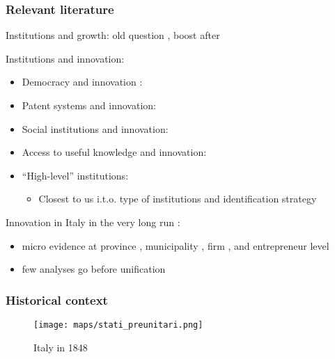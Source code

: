 \documentclass[10pt]{beamer}
\begin{document}
\begin{frame}
    \frametitle{Relevant literature}
    
    Institutions and growth: old question \citep{delong1993}, boost after \cite{acemoglu2001, acemoglu2002} \citep{rodrik2004, aghion2007} \\  \bigskip

    Institutions and innovation: %
    \begin{itemize}
        \item Democracy and innovation \citep[the "Popper" hypothesis][]{gao2017}: \cite{aghion2007, acemoglu2019, gao2017, wang2021}
        \item Patent systems and innovation: \cite{moser2005, lerner2009}
        \item Social institutions and innovation: \cite{greif2012}
        \item Access to useful knowledge and innovation: \citep{buonanno2024}
        \item ``High-level'' institutions: \cite{donges2022}
        \begin{itemize}
            \item Closest to us i.t.o. type of institutions and identification strategy 
        \end{itemize}
    \end{itemize}
    
    \bigskip

    \pause

    Innovation in Italy in the very long run \citep{barbielliniamidei2013, nuvolari2015b}:
    \begin{itemize}
        \item micro evidence at province \citep{nuvolari2018}, municipality \citep{buonanno2024}, firm \citep{domini2023}, and entrepreneur level \citep{toninelli2014, nuvolari2018, domini2019}
        \item few analyses go before unification \citep{nuvolari2019, nuvolari2020}
    \end{itemize}
    
\end{frame}

\begin{frame}
    \frametitle{Historical context}
    
    \begin{figure}
        \centering
        \texttt{[image: maps/stati\_preunitari.png]}
        \caption{Italy in 1848}
        \label{fig:map_italy_1848}
    \end{figure}
    
\end{frame}
\end{document}
